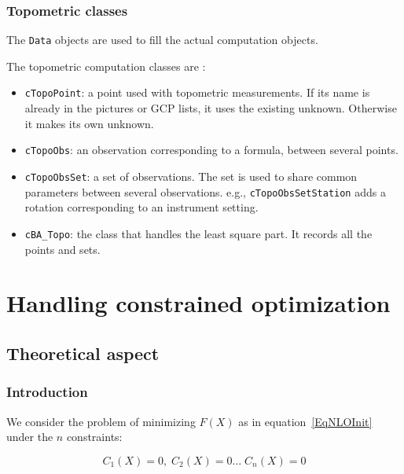 \subsubsection{Topometric classes}

The \texttt{Data} objects are used to fill the actual computation objects.

The topometric computation classes are :
 \begin{itemize}
    \item \texttt{cTopoPoint}: a point used with topometric measurements. If its name is already in the pictures or GCP lists, it uses the existing unknown. Otherwise it makes its own unknown. 
    \item \texttt{cTopoObs}: an observation corresponding to a formula, between several points.
    \item \texttt{cTopoObsSet}: a set of observations. The set is used to share common parameters between several observations. e.g., \texttt{cTopoObsSetStation} adds a rotation corresponding to an instrument setting.   
    \item \texttt{cBA\_Topo}: the class that handles the least square part. It records all the points and sets.
 \end{itemize}


\section{Handling constrained optimization}


\subsection{Theoretical aspect}


\subsubsection{Introduction}

We consider the problem of minimizing $F(X)$ as in equation~\ref{EqNLOInit} under
the $n$ constraints:

\begin{equation}
	C_1(X) =0, \; C_2(X)=0 \dots \;  C_n(X)=0
\end{equation}

